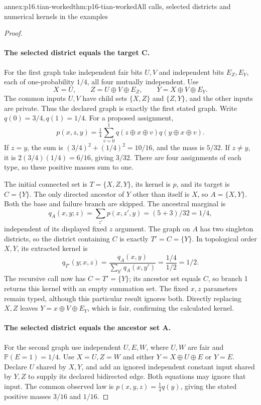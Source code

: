 \begin{annexitem}{annex:p16.tian-worked}{thm:p16-tian-worked}{All calls, selected districts and numerical kernels in the examples}
\begin{proof}
\paragraph{The selected district equals the target C.}
For the first graph take independent fair bits \(U,V\) and
independent bits \(E_Z,E_Y\), each of one-probability \(1/4\),
all four mutually independent. Use
\[
 X=U,\qquad Z=U\oplus V\oplus E_Z,\qquad
 Y=X\oplus V\oplus E_Y.
\]
The common inputs \(U,V\) have child sets \(\{X,Z\}\)
and \(\{Z,Y\}\), and the other inputs are private. Thus the
declared graph is exactly the first stated graph. Write
\(q(0)=3/4,q(1)=1/4\). For a proposed assignment,
\[
 p(x,z,y)=\tfrac14\sum_{v=0}^1
      q(z\oplus x\oplus v)q(y\oplus x\oplus v).
\]
If \(z=y\), the sum is \((3/4)^2+(1/4)^2=10/16\),
and the mass is \(5/32\). If \(z\ne y\), it is
\(2(3/4)(1/4)=6/16\), giving \(3/32\).
There are four assignments of each type, so these positive masses
sum to one.

The initial connected set is \(T=\{X,Z,Y\}\), its kernel
is \(p\), and its target is \(C=\{Y\}\). The only directed
ancestor of \(Y\) other than itself is \(X\), so
\(A=\{X,Y\}\). Both the base and failure branch are skipped.
The ancestral marginal is
\[
 q_A(x,y;z)=\sum_{z'}p(x,z',y)=(5+3)/32=1/4,
\]
independent of its displayed fixed \(z\) argument. The graph
on \(A\) has two singleton districts, so the district containing
\(C\) is exactly \(T'=C=\{Y\}\). In topological order
\(X,Y\), its extracted kernel is
\[
 q_{T'}(y;x,z)=\frac{q_A(x,y)}{\sum_{y'}q_A(x,y')}
             =\frac{1/4}{1/2}=1/2.
\]
The recursive call now has \(C=T'=\{Y\}\); its ancestor
set equals \(C\), so branch 1 returns this kernel with an
empty summation set. The fixed \(x,z\) parameters remain
typed, although this particular result ignores both. Directly
replacing \(X,Z\) leaves \(Y=x\oplus V\oplus E_Y\),
which is fair, confirming the calculated kernel.

\paragraph{The selected district equals the ancestor set A.}
For the second graph use independent \(U,E,W\), where \(U,W\)
are fair and \(\mathbb P(E=1)=1/4\). Use \(X=U,Z=W\)
and either \(Y=X\oplus U\oplus E\) or \(Y=E\).
Declare \(U\) shared by \(X,Y\), and add an ignored
independent constant input shared by \(Y,Z\) to supply its
declared bidirected edge. Both equations may ignore that input.
The common observed law is \(p(x,y,z)=\frac14 q(y)\),
giving the stated positive masses \(3/16\) and \(1/16\).


\end{proof}
\end{annexitem}
